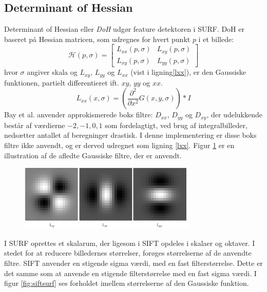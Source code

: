 \subsection{Determinant of Hessian}
Determinant of Hessian eller \textit{DoH} udgør feature detektoren i
SURF. DoH er baseret på Hessian matricen, som udregnes for hvert punkt $p$ i et billede:
\begin{equation}
\mathcal{H}(p, \sigma) = 
 \begin{bmatrix}
 	L_{xx}(p, \sigma) & L_{xy}(p, \sigma) \\
 	L_{xy}(p, \sigma) & L_{yy}(p, \sigma) 
 \end{bmatrix}
 \label{hessianmatrix}
\end{equation}
hvor $\sigma$ angiver skala og $L_{xy} $, $L_{yy}$ og $L_{xx}$ (vist i ligning\eqref{lxx}), er den Gaussiske funktionen, partielt differentieret ift. $xy$, $yy$ og $xx$.
\begin{equation}
L_{xx}(x, \sigma) = (\frac{\partial^2 }{\partial x^2 } G(x,y,\sigma)) * I
\label{lxx}
\end{equation}
Bay et al. anvender approkismerede boks filtre: $D_{xx}$, $D_{yy}$ og $D_{xy}$, der udelukkende består af værdierne $-2,-1,0, 1$ som fordelagtigt, ved brug af integralbilleder, nedsætter antallet af beregninger drastisk. I denne implementering er disse boks filtre ikke anvendt, og er derved udregnet som ligning \eqref{lxx}. Figur \ref{fig:lxxlyylxy} er en illustration af de afledte Gaussiske filtre, der er anvendt.
\begin{figure}[H]
    \centering
    \includegraphics[width=0.75\textwidth]{fig/31.png}
     \vspace{-0.5em}
    \begin{center}    
       \caption{\textcolor{gray}{\footnotesize \textit{ }}}
    \label{fig:lxxlyylxy}
     \end{center}
     \vspace{-2.5em}
  \end{figure} \noindent
I SURF oprettes et skalarum, der ligesom i SIFT opdeles i skalaer og oktaver. I stedet for at reducere billedernes størrelser, forøges størrelserne af de anvendte filtre. SIFT anvender en stigende sigma værdi, med en fast filterstørrelse. Dette er det samme som at anvende en stigende filterstørrelse med en fast sigma værdi. I figur \ref{fig:siftsurf} ses forholdet imellem størrelserne af den Gaussiske funktion.
